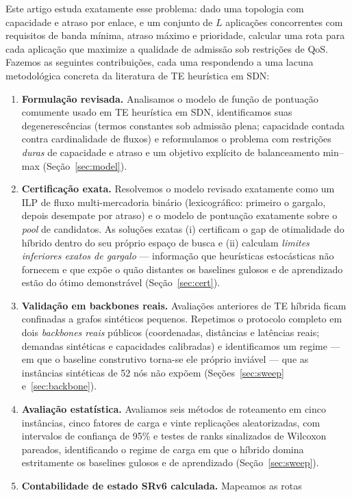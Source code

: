 \documentclass[journal]{IEEEtran}
\begin{document}
Este artigo estuda exatamente esse problema: dado uma topologia com
capacidade e atraso por enlace, e um conjunto de $L$ aplicações concorrentes
com requisitos de banda mínima, atraso máximo e prioridade, calcular uma rota
para cada aplicação que maximize a qualidade de admissão sob restrições de
QoS. Fazemos as seguintes contribuições, cada uma respondendo a uma lacuna
metodológica concreta da literatura de TE heurística em SDN:
\begin{enumerate}
\item \textbf{Formulação revisada.} Analisamos o modelo de função de
pontuação comumente usado em TE heurística em SDN, identificamos suas
degenerescências (termos constantes sob admissão plena; capacidade contada
contra cardinalidade de fluxos) e reformulamos o problema com restrições
\emph{duras} de capacidade e atraso e um objetivo explícito de balanceamento
min--max (Seção~\ref{sec:model}).
\item \textbf{Certificação exata.} Resolvemos o modelo revisado exatamente
como um ILP de fluxo multi-mercadoria binário (lexicográfico: primeiro o
gargalo, depois desempate por atraso) e o modelo de pontuação exatamente
sobre o \emph{pool} de candidatos. As soluções exatas (i) certificam o gap
de otimalidade do híbrido dentro do seu próprio espaço de busca e (ii)
calculam \emph{limites inferiores exatos de gargalo} --- informação que
heurísticas estocásticas não fornecem e que expõe o quão distantes os
baselines gulosos e de aprendizado estão do ótimo demonstrável
(Seção~\ref{sec:cert}).
\item \textbf{Validação em backbones reais.} Avaliações anteriores de TE
híbrida ficam confinadas a grafos sintéticos pequenos. Repetimos o protocolo
completo em dois \emph{backbones reais} públicos (coordenadas, distâncias e
latências reais; demandas sintéticas e capacidades calibradas) e
identificamos um regime --- em que o baseline construtivo torna-se ele
próprio inviável --- que as instâncias sintéticas de 52 nós não expõem
(Seções~\ref{sec:sweep} e~\ref{sec:backbone}).
\item \textbf{Avaliação estatística.} Avaliamos seis métodos de
roteamento em cinco instâncias, cinco fatores de carga e vinte replicações
aleatorizadas, com intervalos de confiança de 95\% e testes de ranks
sinalizados de Wilcoxon pareados, identificando o regime de carga em que o
híbrido domina estritamente os baselines gulosos e de aprendizado
(Seção~\ref{sec:sweep}).
\item \textbf{Contabilidade de estado SRv6 calculada.} Mapeamos as rotas

\end{enumerate}
\end{document}
